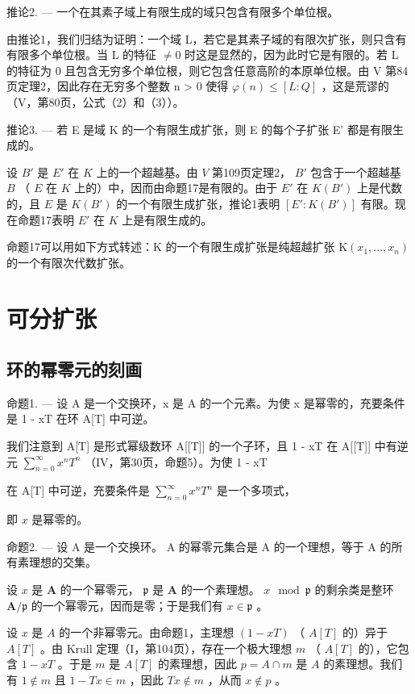推论2. --- 一个在其素子域上有限生成的域只包含有限多个单位根。

由推论1，我们归结为证明：一个域 L，若它是其素子域的有限次扩张，则只含有有限多个单位根。当 L 的特征 \(\neq0\) 时这是显然的，因为此时它是有限的。若 L 的特征为 0 且包含无穷多个单位根，则它包含任意高阶的本原单位根。由 V 第84页定理2，因此存在无穷多个整数 n \textgreater{} 0 使得 \(\varphi(n) \leqslant [L : Q]\) ，这是荒谬的（V，第80页，公式（2）和（3））。

推论3. --- 若 E 是域 K 的一个有限生成扩张，则 E 的每个子扩张 E' 都是有限生成的。

设 \(B'\) 是 \(E'\) 在 \(K\) 上的一个超越基。由 \(V\) 第109页定理2， \(B'\) 包含于一个超越基 \(B\) （ \(E\) 在 \(K\) 上的）中，因而由命题17是有限的。由于 \(E'\) 在 \(K(B')\) 上是代数的，且 \(E\) 是 \(K(B')\) 的一个有限生成扩张，推论1表明 \([E': K(B')]\) 有限。现在命题17表明 \(E'\) 在 \(K\) 上是有限生成的。

命题17可以用如下方式转述：K 的一个有限生成扩张是纯超越扩张 \(\mathrm{K}(x_{1},\ldots,x_{n})\) 的一个有限次代数扩张。

\section{可分扩张}

\subsection{环的幂零元的刻画}

命题1. --- 设 A 是一个交换环，x 是 A 的一个元素。为使 x 是幂零的，充要条件是 1 - xT 在环 A{[}T{]} 中可逆。

我们注意到 A{[}T{]} 是形式幂级数环 A{[}{[}T{]}{]} 的一个子环，且 1 - xT 在 A{[}{[}T{]}{]} 中有逆元 \(\sum_{n=0}^{\infty} x^{n} T^{n}\) （IV，第30页，命题5）。为使 1 - xT

在 A{[}T{]} 中可逆，充要条件是 \(\sum_{n=0}^{\infty} x^n T^n\) 是一个多项式，

即 \(x\) 是幂零的。

命题2. --- 设 A 是一个交换环。 A 的幂零元集合是 A 的一个理想，等于 A 的所有素理想的交集。

设 \(x\) 是 \(\mathbf{A}\) 的一个幂零元， \(\mathfrak{p}\) 是 \(\mathbf{A}\) 的一个素理想。 \(x \mod \mathfrak{p}\) 的剩余类是整环 \(\mathbf{A} / \mathfrak{p}\) 的一个幂零元，因而是零；于是我们有 \(x \in \mathfrak{p}\) 。

设 \(x\) 是 \(A\) 的一个非幂零元。由命题1，主理想 \((1 - xT)\) （ \(A[T]\) 的）异于 \(A[T]\) 。由 Krull 定理（I，第104页），存在一个极大理想 \(m\) （ \(A[T]\) 的），它包含 \(1 - xT\) 。于是 \(m\) 是 \(A[T]\) 的素理想，因此 \(p = A \cap m\) 是 \(A\) 的素理想。我们有 \(1 \notin m\) 且 \(1 - Tx \in m\) ，因此 \(Tx \notin m\) ，从而 \(x \notin p\) 。

